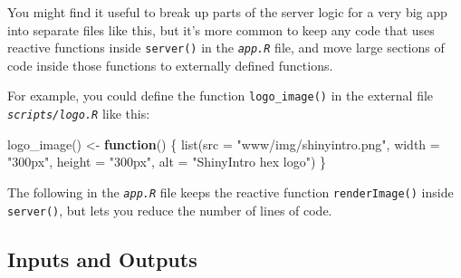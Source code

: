 \documentclass[
  oneside]{book}
\newenvironment{Shaded}{\begin{snugshade}}{\end{snugshade}}
\newcommand{\AttributeTok}[1]{\textcolor[rgb]{0.77,0.63,0.00}{#1}}
\newcommand{\ConstantTok}[1]{\textcolor[rgb]{0.00,0.00,0.00}{#1}}
\newcommand{\ControlFlowTok}[1]{\textcolor[rgb]{0.13,0.29,0.53}{\textbf{#1}}}
\newcommand{\FunctionTok}[1]{\textcolor[rgb]{0.00,0.00,0.00}{#1}}
\newcommand{\NormalTok}[1]{#1}
\newcommand{\OtherTok}[1]{\textcolor[rgb]{0.56,0.35,0.01}{#1}}
\newcommand{\SpecialCharTok}[1]{\textcolor[rgb]{0.00,0.00,0.00}{#1}}
\newcommand{\StringTok}[1]{\textcolor[rgb]{0.31,0.60,0.02}{#1}}
\begin{document}
You might find it useful to break up parts of the server logic for a very big app into separate files like this, but it's more common to keep any code that uses reactive functions inside \texttt{server}\texttt{()} in the \textit{\texttt{app.R}} file, and move large sections of code inside those functions to externally defined functions.

For example, you could define the function \texttt{logo\_image}\texttt{()} in the external file \textit{\texttt{scripts/logo.R}} like this:

\begin{Shaded}
\begin{Highlighting}[]
\FunctionTok{logo\_image}\NormalTok{() }\OtherTok{\textless{}{-}} \ControlFlowTok{function}\NormalTok{() \{}
  \FunctionTok{list}\NormalTok{(}\AttributeTok{src =} \StringTok{"www/img/shinyintro.png"}\NormalTok{,}
       \AttributeTok{width =} \StringTok{"300px"}\NormalTok{,}
       \AttributeTok{height =} \StringTok{"300px"}\NormalTok{,}
       \AttributeTok{alt =} \StringTok{"ShinyIntro hex logo"}\NormalTok{)}
\NormalTok{\}}
\end{Highlighting}
\end{Shaded}

The following in the \textit{\texttt{app.R}} file keeps the reactive function \texttt{renderImage}\texttt{()} inside \texttt{server}\texttt{()}, but lets you reduce the number of lines of code.

\begin{Shaded}
\end{Shaded}

\hypertarget{inputs-and-outputs}{%
\subsection{Inputs and Outputs}\label{inputs-and-outputs}}
\end{document}
